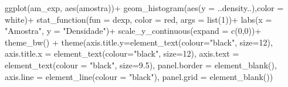 \documentclass[
]{article}
\newenvironment{Shaded}{\begin{snugshade}}{\end{snugshade}}
\newcommand{\AttributeTok}[1]{\textcolor[rgb]{0.77,0.63,0.00}{#1}}
\newcommand{\DecValTok}[1]{\textcolor[rgb]{0.00,0.00,0.81}{#1}}
\newcommand{\FloatTok}[1]{\textcolor[rgb]{0.00,0.00,0.81}{#1}}
\newcommand{\FunctionTok}[1]{\textcolor[rgb]{0.00,0.00,0.00}{#1}}
\newcommand{\NormalTok}[1]{#1}
\newcommand{\SpecialCharTok}[1]{\textcolor[rgb]{0.00,0.00,0.00}{#1}}
\newcommand{\StringTok}[1]{\textcolor[rgb]{0.31,0.60,0.02}{#1}}
\begin{document}
\begin{Shaded}
\begin{Highlighting}[]
\FunctionTok{ggplot}\NormalTok{(am\_exp, }\FunctionTok{aes}\NormalTok{(amostra))}\SpecialCharTok{+}
  \FunctionTok{geom\_histogram}\NormalTok{(}\FunctionTok{aes}\NormalTok{(}\AttributeTok{y =}\NormalTok{ ..density..),}\AttributeTok{color =} \StringTok{\textquotesingle{}white\textquotesingle{}}\NormalTok{)}\SpecialCharTok{+}
  \FunctionTok{stat\_function}\NormalTok{(}\AttributeTok{fun =}\NormalTok{ dexp, }\AttributeTok{color =} \StringTok{\textquotesingle{}red\textquotesingle{}}\NormalTok{, }\AttributeTok{args =} \FunctionTok{list}\NormalTok{(}\DecValTok{1}\NormalTok{))}\SpecialCharTok{+}
  \FunctionTok{labs}\NormalTok{(}\AttributeTok{x =} \StringTok{"Amostra"}\NormalTok{, }\AttributeTok{y =} \StringTok{"Densidade"}\NormalTok{)}\SpecialCharTok{+}
  \FunctionTok{scale\_y\_continuous}\NormalTok{(}\AttributeTok{expand =} \FunctionTok{c}\NormalTok{(}\DecValTok{0}\NormalTok{,}\DecValTok{0}\NormalTok{))}\SpecialCharTok{+}
  \FunctionTok{theme\_bw}\NormalTok{() }\SpecialCharTok{+}
  \FunctionTok{theme}\NormalTok{(}\AttributeTok{axis.title.y=}\FunctionTok{element\_text}\NormalTok{(}\AttributeTok{colour=}\StringTok{"black"}\NormalTok{, }\AttributeTok{size=}\DecValTok{12}\NormalTok{),}
        \AttributeTok{axis.title.x =} \FunctionTok{element\_text}\NormalTok{(}\AttributeTok{colour=}\StringTok{"black"}\NormalTok{, }\AttributeTok{size=}\DecValTok{12}\NormalTok{),}
        \AttributeTok{axis.text =} \FunctionTok{element\_text}\NormalTok{(}\AttributeTok{colour =} \StringTok{"black"}\NormalTok{, }\AttributeTok{size=}\FloatTok{9.5}\NormalTok{),}
        \AttributeTok{panel.border =} \FunctionTok{element\_blank}\NormalTok{(),}
        \AttributeTok{axis.line =} \FunctionTok{element\_line}\NormalTok{(}\AttributeTok{colour =} \StringTok{"black"}\NormalTok{),}
        \AttributeTok{panel.grid =} \FunctionTok{element\_blank}\NormalTok{()) }


\end{Highlighting}
\end{Shaded}
\end{document}
